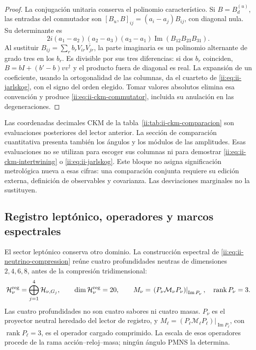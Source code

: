 \begin{proof}
La conjugación unitaria conserva el polinomio característico. Si
\(B=B_d^{(u)}\), las entradas del conmutador son
\([B_u,B]_{ij}=(a_i-a_j)B_{ij}\), con diagonal nula. Su determinante es
\[
 2i(a_1-a_2)(a_2-a_3)(a_3-a_1)
     \operatorname{Im}(B_{12}B_{23}B_{31}).
\]
Al sustituir \(B_{ij}=\sum_r b_rV_{ir}\overline{V_{jr}}\), la parte
imaginaria es un polinomio alternante de grado tres en los \(b_r\).
Es divisible por sus tres diferencias: si dos \(b_r\) coinciden,
\(B=bI+(b'-b)vv^\dagger\) y el producto fuera de diagonal es real.
La expansión de un coeficiente, usando la ortogonalidad de las columnas,
da el cuarteto de \eqref{ii:eq:ii-jarlskog}, con el signo del orden elegido.
Tomar valores absolutos elimina esa convención y produce
\eqref{ii:eq:ii-ckm-commutator}, incluida su anulación en las degeneraciones.
\end{proof}

\begin{remark}
Las coordenadas decimales CKM de la
tabla~\ref{ii:tab:ii-ckm-comparacion} son evaluaciones posteriores del
lector anterior. La sección de comparación cuantitativa presenta también
los ángulos y los módulos de las amplitudes. Esas evaluaciones no se
utilizan para escoger sus columnas ni para demostrar
\eqref{ii:eq:ii-ckm-intertwining} o \eqref{ii:eq:ii-jarlskog}.
Este bloque no asigna significación metrológica nueva a esas cifras:
una comparación conjunta requiere su edición externa, definición de
observables y covarianza. Las desviaciones marginales no la sustituyen.
\end{remark}

\subsection{Registro leptónico, operadores y marcos espectrales}

El sector leptónico conserva otro dominio. La construcción espectral de
\eqref{ii:eq:ii-neutrino-compression} reúne cuatro profundidades neutras de dimensiones
\(2,4,6,8\), antes de la compresión tridimensional:
\begin{equation}
 \mathcal H_\nu^{\rm reg}
 =\bigoplus_{j=1}^{4}\mathcal H_{\nu,G_j},\qquad
 \dim\mathcal H_\nu^{\rm reg}=20,\qquad
 M_\nu=\left.(P_\nu\mathcal M_\nu P_\nu)\right|_{\operatorname{Im}P_\nu},
 \quad\operatorname{rank}P_\nu=3.
 \label{ii:eq:ii-neutrino-compression}
\end{equation}
Las cuatro profundidades no son cuatro sabores ni cuatro masas.
\(P_\nu\) es el proyector neutral heredado del lector de registro, y
\(M_\ell=\left.(P_\ell\mathcal M_\ell P_\ell)\right|_{\operatorname{Im}P_\ell}\),
con \(\operatorname{rank}P_\ell=3\), es el operador cargado comprimido.
La escala de esos operadores procede de la rama acción--reloj--masa;
ningún ángulo PMNS la determina.

